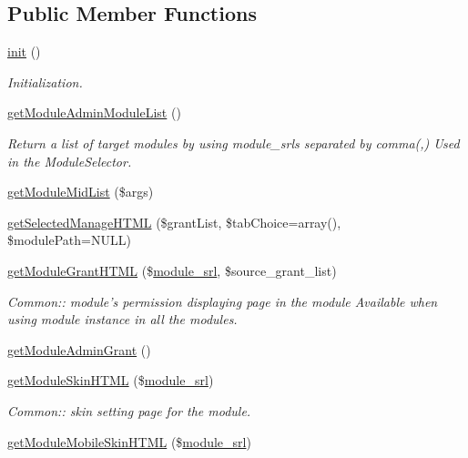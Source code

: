 \subsection*{Public Member Functions}
\begin{DoxyCompactItemize}
\item 
\hyperlink{classmoduleAdminModel_ad12d0ad0d64fc00df2ffef5d95446ff9}{init} ()
\begin{DoxyCompactList}\small\item\em Initialization. \end{DoxyCompactList}\item 
\hyperlink{classmoduleAdminModel_ab87a76519a343b50db20d17983b4d2c7}{get\+Module\+Admin\+Module\+List} ()
\begin{DoxyCompactList}\small\item\em Return a list of target modules by using module\+\_\+srls separated by comma(,) Used in the Module\+Selector. \end{DoxyCompactList}\item 
\hyperlink{classmoduleAdminModel_af1e58f7c102a8ee238f25ff2b193e6d7}{get\+Module\+Mid\+List} (\$args)
\item 
\hyperlink{classmoduleAdminModel_ada2b0f866658526c7cf2bb5876b0c087}{get\+Selected\+Manage\+H\+T\+M\+L} (\$grant\+List, \$tab\+Choice=array(), \$module\+Path=N\+U\+L\+L)
\item 
\hyperlink{classmoduleAdminModel_a0ab602897fb53096f7b232338c533839}{get\+Module\+Grant\+H\+T\+M\+L} (\$\hyperlink{ko_8install_8php_a370bb6450fab1da3e0ed9f484a38b761}{module\+\_\+srl}, \$source\+\_\+grant\+\_\+list)
\begin{DoxyCompactList}\small\item\em Common\+:\+: module's permission displaying page in the module Available when using module instance in all the modules. \end{DoxyCompactList}\item 
\hyperlink{classmoduleAdminModel_a84f8431365473f8ddb70cb9cc1976db1}{get\+Module\+Admin\+Grant} ()
\item 
\hyperlink{classmoduleAdminModel_a7d52af7d5e35ad9ea0749a550e28e483}{get\+Module\+Skin\+H\+T\+M\+L} (\$\hyperlink{ko_8install_8php_a370bb6450fab1da3e0ed9f484a38b761}{module\+\_\+srl})
\begin{DoxyCompactList}\small\item\em Common\+:\+: skin setting page for the module. \end{DoxyCompactList}\item 
\hyperlink{classmoduleAdminModel_a38c85d9c28facff15f1c54ebe1e5b70b}{get\+Module\+Mobile\+Skin\+H\+T\+M\+L} (\$\hyperlink{ko_8install_8php_a370bb6450fab1da3e0ed9f484a38b761}{module\+\_\+srl})

\end{DoxyCompactItemize}
